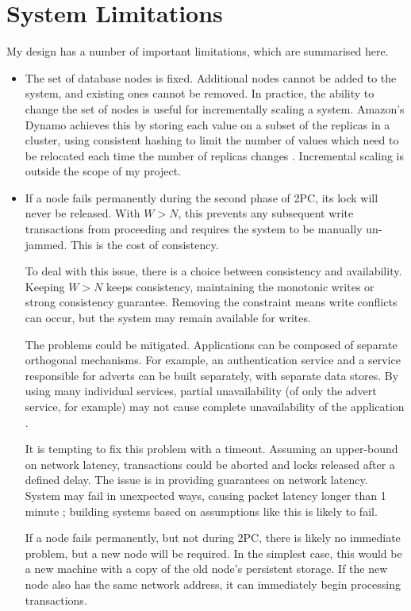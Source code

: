 \documentclass[12pt,a4paper,twoside,openany]{report}
\begin{document}
\section{System Limitations}

My design has a number of important limitations, which are summarised here.

\begin{itemize}
\item
The set of database nodes is fixed. Additional nodes cannot be added to the system, and existing ones cannot be removed. In practice, the ability to change the set of nodes is useful for incrementally scaling a system. Amazon's Dynamo achieves this by storing each value on a subset of the replicas in a cluster, using consistent hashing to limit the number of values which need to be relocated each time the number of replicas changes \cite{decandia2007dynamo}. Incremental scaling is outside the scope of my project.

\item
If a node fails permanently during the second phase of 2PC, its lock will never be released. With $W > N$, this prevents any subsequent write transactions from proceeding and requires the system to be manually un-jammed. This is the cost of consistency.

To deal with this issue, there is a choice between consistency and availability. Keeping $W > N$ keeps consistency, maintaining the monotonic writes or strong consistency guarantee. Removing the constraint means write conflicts can occur, but the system may remain available for writes.

The problems could be mitigated. Applications can be composed of separate orthogonal mechanisms. For example, an authentication service and a service responsible for adverts can be built separately, with separate data stores. By using many individual services, partial unavailability (of only the advert service, for example) may not cause complete unavailability of the application \cite{fox1999harvest}. %

It is tempting to fix this problem with a timeout. Assuming an upper-bound on network latency, transactions could be aborted and locks released after a defined delay. The issue is in providing guarantees on network latency. System may fail in unexpected ways, causing packet latency longer than 1 minute \cite{imbriaco_2012}; building systems based on assumptions like this is likely to fail.

If a node fails permanently, but not during 2PC, there is likely no immediate problem, but a new node will be required. In the simplest case, this would be a new machine with a copy of the old node's persistent storage. If the new node also has the same network address, it can immediately begin processing transactions.


\end{itemize}
\end{document}
